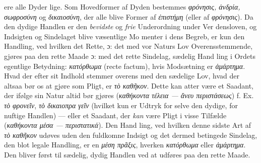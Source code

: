 \documentclass[12pt,a4paper]{book}
\newcommand{\gk}[1]{\textit{#1}}
\begin{document}
ere alle Dyder lige. Som Hovedformer af Dyden bestemmes
\gk{φρόνησις, ἀνδρία, σωφροσύνη} og \gk{δικαιοσύνη}, der alle blive
Former af \gk{ἐπιστήμη} (eller af \gk{φρόνησις}). Da den dydige
Handlen er den \emph{bevidste} og \emph{frie} Underordning under Ver\-%
densloven, og Indsigten og Sindelaget blive væsentlige Mo\-%
menter i dens Begreb, er kun den Handling, ved hvilken det
Rette, ɔ: det med vor Naturs Lov Overensstemmende, gjøres
paa den rette Maade ɔ: med det rette Sindelag, sædelig Hand\-%
ling i Ordets egentlige Betydning: \gk{κατόρθωμα} (recte factum),
hvis Modsætning er \gk{ἁμάρτημα}. Hvad der efter sit Indhold
stemmer overens med den sædelige Lov, hvad der altsaa bør
os at gjøre som Pligt, er \gk{τὸ καθῆκον}. Dette kan atter være
et Saadant, der ifølge sin Natur altid bør gjøres (\gk{καθήκοντα
τέλεια --- ἄνευ περιστάσεως}) f. Ex. \gk{τὸ φρονεῖν}, \gk{τὸ δικαιοπρα\-%
γεῖν} (hvilket kun er Udtryk for selve den dydige, for\-%
nuftige Handlen) --- eller et Saadant, der \emph{kan} være Pligt
i visse Tilfælde (\gk{καθήκοντα μέσα --- περιστατικά}). Den Hand\-%
ling, ved hvilken denne sidste Art af \gk{τὸ καθῆκον} udøves uden
den fuldkomne Indsigt og det dermed betingede Sindelag, den
blot legale Handling, er en \gk{μέση πρᾶξις}, hverken \gk{κατόρθωμα}
eller \gk{ἁμάρτημα}. Den bliver først til sædelig, dydig Handlen
ved at udføres paa den rette Maade.
\end{document}
